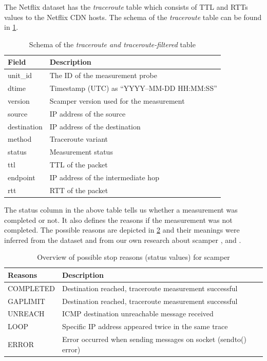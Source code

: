 \FloatBarrier

The Netflix dataset has the \textit{traceroute} table which consists of TTL and RTTs values to the Netflix CDN hosts. The schema of the \textit{traceroute} table can be found in \cref{table:traceroute}.  

\begin{table}[!h]
	\centering
	\caption{Schema of the \textit{traceroute and traceroute-filtered} table}
	\label{table:traceroute}
	\begin{tabular}{lp{10cm}}
  		\toprule
  		\textbf{Field} & \textbf{Description} \\ 
  		\midrule
  		unit\_id & The ID of the measurement probe \\ 
  		dtime & Timestamp (UTC) as “YYYY–MM-DD HH:MM:SS” \\ 
		version & Scamper version used for the measurement \\ 
		source &  IP address of the source \\ 
		destination & IP address of the destination \\ 
		method & Traceroute variant \\ 
		status & Measurement status \\  
		ttl & TTL of the packet \\ 
		endpoint & IP address of the intermediate hop \\
		rtt & RTT of the packet \\
  		\bottomrule
\end{tabular}
\end{table}

\FloatBarrier

The status column in the above table tells us whether a measurement was completed or not. It also defines the reasons if the measurement was not completed. 
The possible reasons are depicted in \cref{table:status} and their meanings were inferred from the
dataset and from our own research about scamper \cite{status1}, and \cite{status2}.

\begin{table}[!h]
	\centering
	\caption{Overview of possible stop reasons (status values) for scamper}
	\label{table:status}
	\begin{tabular}{lp{7cm}}
  		\toprule
  		\textbf{Reasons} & \textbf{Description} \\ 
  		\midrule
  		COMPLETED & Destination reached, traceroute measurement successful \\
  		GAPLIMIT & Destination reached, traceroute measurement successful \\
		UNREACH & ICMP destination unreachable message received \\
		LOOP & Specific IP address appeared twice in the same trace \\
		ERROR & Error occurred when sending messages on socket (sendto() error) \\
  		\bottomrule
\end{tabular}
\end{table}

